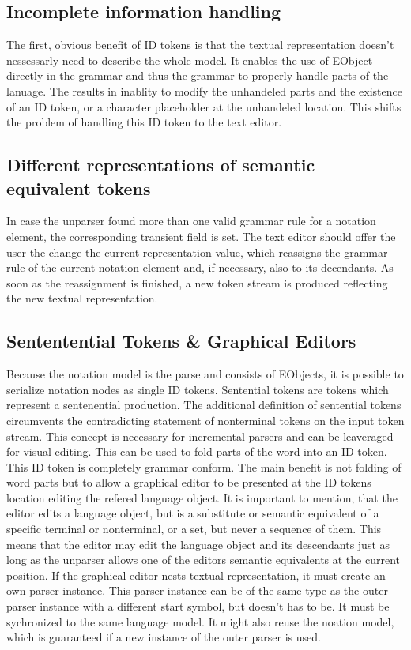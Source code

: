 \subsection{Incomplete information handling}
The first, obvious benefit of ID tokens is that the textual representation doesn't nessessarly need to describe the whole model. It enables the use of EObject directly in the grammar and thus the grammar to properly handle parts of the lanuage. The results in inablity to modify the unhandeled parts and the existence of an ID token, or a character placeholder at the unhandeled location. This shifts the problem of handling this ID token to the text editor.

\subsection{Different representations of semantic equivalent tokens}
In case the unparser found more than one valid grammar rule for a notation element, the corresponding transient field is set. The text editor should offer the user the change the current representation value, which reassigns the grammar rule of the current notation element and, if necessary, also to its decendants. As soon as the reassignment is finished, a new token stream is produced reflecting the new textual representation.


\subsection{Sententential Tokens \& Graphical Editors}
Because the notation model is the parse and consists of EObjects, it is possible to serialize notation nodes as single ID tokens. Sentential tokens are tokens which represent a sentenential production. The additional definition of sentential tokens circumvents the contradicting statement of nonterminal tokens on the input token stream. This concept is necessary for incremental parsers and can be leaveraged for visual editing. This can be used to fold parts of the word into an ID token. This ID token is completely grammar conform. The main benefit is not folding of word parts but to allow a graphical editor to be presented at the ID tokens location editing the refered language object. It is important to mention, that the editor edits a language object, but is a substitute or semantic equivalent of a specific terminal or nonterminal, or a set, but never a sequence of them. This means that the editor may edit the language object and its descendants just as long as the unparser allows one of the editors semantic equivalents at the current position. If the graphical editor nests textual representation, it must create an own parser instance. This parser instance can be of the same type as the outer parser instance with a different start symbol, but doesn't has to be. It must be sychronized to the same language model. It might also reuse the noation model, which is guaranteed if a new instance of the outer parser is used.

 \\
 \\
 \\
 \\